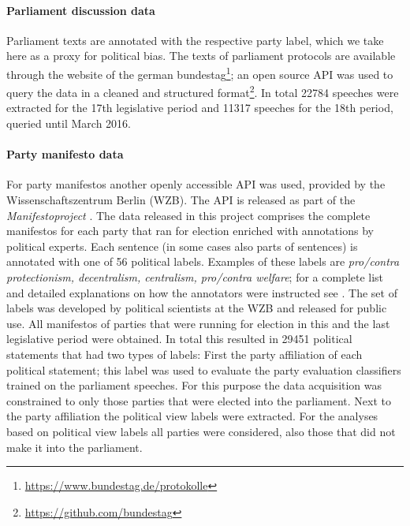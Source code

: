 \documentclass{article}
\begin{document}
\paragraph{Parliament discussion data} Parliament texts are annotated with the respective party label, which we take here as a proxy for political bias. The texts of parliament protocols are available through the website of the german bundestag\footnote{\url{https://www.bundestag.de/protokolle}}; an open source API was used to query the data in a cleaned and structured format\footnote{\url{https://github.com/bundestag}}. In total 22784 speeches were extracted for the 17th legislative period and 11317 speeches for the 18th period, queried until March 2016. 

\paragraph{Party manifesto data}
For party manifestos another openly accessible API was used, provided by the Wissenschaftszentrum Berlin (WZB). The API is released as part of the {\em Manifestoproject} \cite{manifesto}. The data released in this project comprises the complete manifestos for each party that ran for election enriched with annotations by political experts. Each sentence (in some cases also parts of sentences) is annotated with one of 56 political labels. Examples of these labels are {\em pro/contra protectionism, decentralism, centralism, pro/contra welfare}; for a complete list and detailed explanations on how the annotators were instructed see \cite{leftright}. The set of labels was developed by political scientists at the WZB and released for public use. All manifestos of parties that were running for election in this and the last legislative period were obtained. In total this resulted in 29451 political statements that had two types of labels: First the party affiliation of each political statement; this label was used to evaluate the party evaluation classifiers trained on the parliament speeches. For this purpose the data acquisition was constrained to only those parties that were elected into the parliament. Next to the party affiliation the political view labels were extracted. For the analyses based on political view labels all parties were considered, also those that did not make it into the parliament. 
\end{document}
